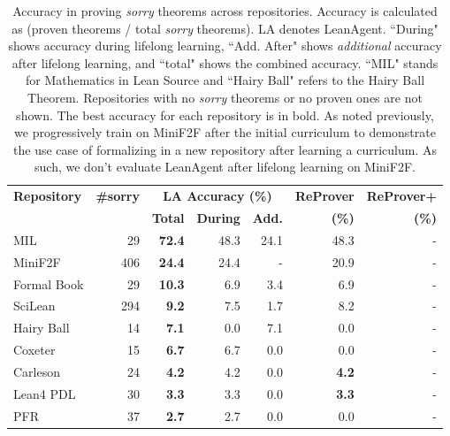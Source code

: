 \begin{table}
    \caption{Accuracy in proving \textit{sorry} theorems across repositories. Accuracy is calculated as (proven theorems / total \textit{sorry} theorems). LA denotes LeanAgent. ``During" shows accuracy during lifelong learning, ``Add. After" shows \textit{additional} accuracy after lifelong learning, and ``total" shows the combined accuracy. ``MIL" stands for Mathematics in Lean Source and ``Hairy Ball" refers to the Hairy Ball Theorem. Repositories with no \textit{sorry} theorems or no proven ones are not shown. The best accuracy for each repository is in bold. As noted previously, we progressively train on MiniF2F after the initial curriculum to demonstrate the use case of formalizing in a new repository after learning a curriculum. As such, we don't evaluate LeanAgent after lifelong learning on MiniF2F.}
    \label{tab:theorem-proofs1}
    \centering
    \small
    \begin{tabular}{@{}l|r|rrr|r|r@{}}
    \hline
    \textbf{Repository} & \textbf{\#sorry} & \multicolumn{3}{c|}{\textbf{LA Accuracy (\%)}} & \textbf{ReProver} & \textbf{ReProver+} \\
    & & \textbf{Total} & \textbf{During} & \textbf{Add.} & \textbf{(\%)} & \textbf{(\%)} \\
    \hline
    MIL & 29 & \textbf{72.4} & 48.3 & 24.1 & 48.3 & - \\
    MiniF2F & 406 & \textbf{24.4} & 24.4 & - & 20.9 & - \\
    Formal Book & 29 & \textbf{10.3} & 6.9 & 3.4 & 6.9 & - \\
    SciLean & 294 & \textbf{9.2} & 7.5 & 1.7 & 8.2 & - \\
    Hairy Ball & 14 & \textbf{7.1} & 0.0 & 7.1 & 0.0 & - \\
    Coxeter & 15 & \textbf{6.7} & 6.7 & 0.0 & 0.0 & - \\
    Carleson & 24 & \textbf{4.2} & 4.2 & 0.0 & \textbf{4.2} & - \\
    Lean4 PDL & 30 & \textbf{3.3} & 3.3 & 0.0 & \textbf{3.3} & - \\
    PFR & 37 & \textbf{2.7} & 2.7 & 0.0 & 0.0 & - \\
    \hline
    \end{tabular}
\end{table}